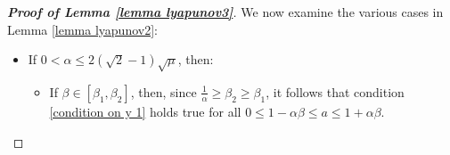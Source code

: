 \documentclass[reqno]{amsart}
\theoremstyle{plain}
\theoremstyle{definition}
\theoremstyle{remark}
\newcommand{\VA}{\VAcomment}
\newcommand{\Fb}{\mathcal{F}}
\newcommand{\VM}[1]{}
\begin{document}
\begin{proof}[\textbf{Proof of Lemma \ref{lemma lyapunov3}}]
	
	
	
	We now examine the various cases in Lemma \ref{lemma lyapunov2}:
	\begin{itemize}[wide=0pt]
		\item If $0<\alpha\leq 2(\sqrt{2}-1)\sqrt{\mu}$, then:	
		\begin{itemize}[wide=5pt]
			\item[\textbf{-}] If $\beta \in [\beta_{1},\beta_{2}]$, then, since $\frac{1}{\alpha} \geq \beta_{2} \geq \beta_{1}$, it follows that condition \eqref{condition on y 1} holds true for all $0\leq 1-\alpha\beta\leq a\leq 1+\alpha\beta$.
			
			
			

\end{itemize}
\end{itemize}
\end{proof}
\end{document}
